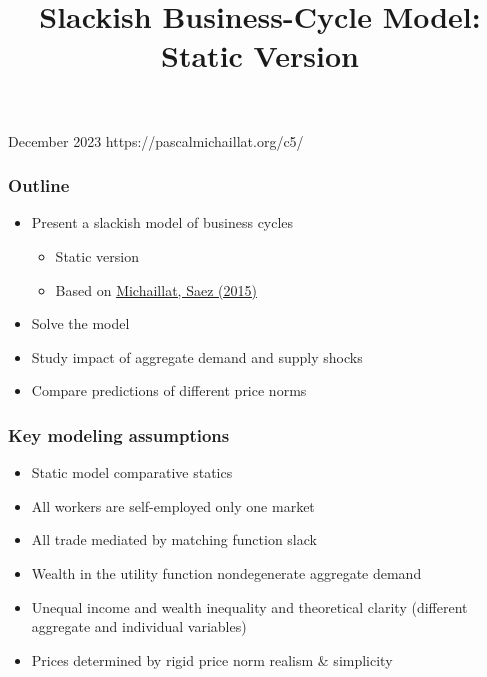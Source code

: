 \documentclass[11pt,aspectratio=169,xcolor={dvipsnames},hyperref={pdftex,pdfpagemode=UseNone,hidelinks,pdfdisplaydoctitle=true},usepdftitle=false]{beamer}
\begin{document}
\title{Slackish Business-Cycle Model: Static Version}
%
{December 2023}%
{https://pascalmichaillat.org/c5/}
\frame{\titlepage}

\begin{frame}
\frametitle{Outline}
\begin{itemize}
\item Present a slackish model of business cycles
\begin{itemize}
\item Static version
\item Based on \href{https://pascalmichaillat.org/3/}{Michaillat, Saez (2015)}
\end{itemize}
\item Solve the model
\item Study impact of aggregate demand and supply shocks
\item Compare predictions of different price norms
\end{itemize}	
\end{frame}

\begin{frame}
\frametitle{Key modeling assumptions}
\begin{itemize}
	\item Static model \then comparative statics
	\item All workers are self-employed \then only one market
	\item All trade mediated by matching function \then slack
	\item Wealth in the utility function \then nondegenerate aggregate demand
	\item Unequal income and wealth \then inequality and theoretical clarity (different aggregate and individual variables)
	\item Prices determined by rigid price norm \then realism \& simplicity
\end{itemize}
\end{frame}

\begin{frame}
\end{frame}
\end{document}
